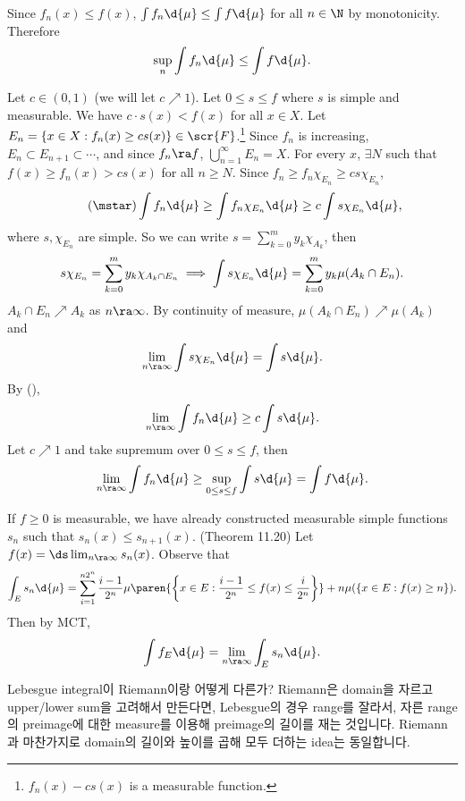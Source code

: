 \pf \\
\note{\(\geq\)} Since \(f_n(x) \leq f(x)\), \(\int f_n \d{\mu} \leq \int f \d{\mu}\) for all \(n\in \N\) by monotonicity. Therefore
\[
    \sup_n \int f_n \d{\mu} \leq \int f \d{\mu}.
\]

\note{\(\leq\)} Let \(c \in (0, 1)\) (we will let \(c \nearrow 1\)). Let \(0 \leq s \leq f\) where \(s\) is simple and measurable. We have \(c \cdot s(x) < f(x)\) for all \(x \in X\). Let \(E_n = \{x \in X : f_n(x) \geq cs(x)\} \in \scr{F}\).\footnote{\(f_n(x) - cs(x)\) is a measurable function.} Since \(f_n\) is increasing, \(E_n\subset E_{n+1} \subset \cdots\), and since \(f_n \ra f\), \(\bigcup_{n=1}^\infty E_n = X\). For every \(x\), \(\exists N\) such that \(f(x) \geq f_n(x) > cs(x)\) for all \(n \geq N\). Since \(f_n \geq f_n \chi_{E_n} \geq cs \chi_{E_n}\),
\[ \tag{\mstar}
    \int f_n \d{\mu} \geq \int f_n \chi_{E_n} \d{\mu} \geq c\int s \chi_{E_n} \d{\mu},
\]
where \(s, \chi_{E_n}\) are simple. So we can write \(s = \sum_{k=0}^m y_k \chi_{A_k}\), then
\[
    s\chi_{E_n} = \sum_{k=0}^m y_k \chi_{A_k\cap E_n} \implies \int s \chi_{E_n} \d{\mu} = \sum_{k=0}^m y_k \mu(A_k\cap E_n).
\]
\(A_k\cap E_n \nearrow A_k\) as \(n\ra\infty\). By continuity of measure, \(\mu(A_k \cap E_n) \nearrow \mu(A_k)\) and
\[
    \lim_{n\ra\infty} \int s \chi_{E_n}\d{\mu} = \int s \d{\mu}.
\]
By (\mstar),
\[
    \lim_{n\ra\infty} \int f_n \d{\mu} \geq c\int s \d{\mu}.
\]
Let \(c \nearrow 1\) and take supremum over \(0\leq s\leq f\), then
\[
    \lim_{n\ra\infty} \int f_n \d{\mu} \geq \sup_{0\leq s\leq f} \int s \d{\mu} = \int f \d{\mu}.
\]

\pagebreak

\rmk If \(f \geq 0\) is measurable, we have already constructed measurable simple functions \(s_n\) such that \(s_n(x) \leq s_{n+1}(x)\). ({\sffamily Theorem 11.20}) Let \(f(x) = \ds \lim_{n\ra\infty} s_n(x)\). Observe that
\[
    \int_E s_n \d{\mu} = \sum_{i=1}^{n2^n} \frac{i - 1}{2^n}\mu\paren{\left\{x \in E : \frac{i-1}{2^n} \leq f(x) \leq \frac{i}{2^n}\right\}} + n\mu(\{x \in E : f(x)\geq n\}).
\]
Then by MCT,
\[
    \int f_E \d{\mu} = \lim_{n\ra\infty} \int_E s_n \d{\mu}.
\]

\bigskip

Lebesgue integral이 Riemann이랑 어떻게 다른가? Riemann은 domain을 자르고 upper/lower sum을 고려해서 만든다면, Lebesgue의 경우 range를 잘라서, 자른 range의 preimage에 대한 measure를 이용해 preimage의 길이를 재는 것입니다. Riemann과 마찬가지로 domain의 길이와 높이를 곱해 모두 더하는 idea는 동일합니다.

